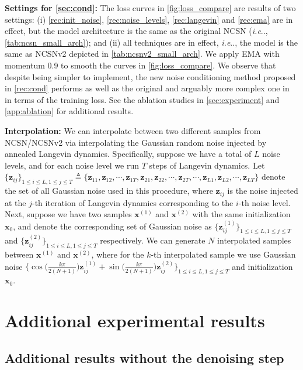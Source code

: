 \documentclass{article}
\makeatletter
\def\@onedot{\ifx\@let@token.\else.\null\fi\xspace}
\DeclareRobustCommand\onedot{\futurelet\@let@token\@onedot}
\newcommand{\bfx}{\mathbf{x}}
\newcommand{\bfz}{\mathbf{z}}
\def\ie{\emph{i.e}\onedot}
\makeatother
\begin{document}
\textbf{Settings for \cref{sec:cond}:}
The loss curves in \cref{fig:loss_compare} are results of two settings: (i) \cref{rec:init_noise}, \ref{rec:noise_levels}, \ref{rec:langevin} and \ref{rec:ema} are in effect, but the model architecture is the same as the original NCSN (\ie, \cref{tab:ncsn_small_arch}); and (ii) all techniques are in effect, \ie, the model is the same as NCSNv2 depicted in \cref{tab:ncsnv2_small_arch}. We apply EMA with momentum 0.9 to smooth the curves in \cref{fig:loss_compare}. We observe that despite being simpler to implement, the new noise conditioning method proposed in \cref{rec:cond} performs as well as the original and arguably more complex one in \cite{song2019generative} in terms of the training loss. See the ablation studies in \cref{sec:experiment} and \cref{app:ablation} for additional results.

\textbf{Interpolation:} We can interpolate between two different samples from NCSN/NCSNv2 via interpolating the Gaussian random noise injected by annealed Langevin dynamics. Specifically, suppose we have a total of $L$ noise levels, and for each noise level we run $T$ steps of Langevin dynamics. Let $\{\bfz_{ij}\}_{1\leq i\leq L, 1\leq j\leq T} \triangleq \{\bfz_{11}, \bfz_{12}, \cdots, \bfz_{1T}, \bfz_{21}, \bfz_{22}, \cdots, \bfz_{2T}, \cdots, \bfz_{L1}, \bfz_{L2}, \cdots, \bfz_{LT}\}$ denote the set of all Gaussian noise used in this procedure, where $\bfz_{ij}$ is the noise injected at the $j$-th iteration of Langevin dynamics corresponding to the $i$-th noise level. Next, suppose we have two samples $\bfx^{(1)}$ and $\bfx^{(2)}$ with the same initialization $\bfx_0$, and denote the corresponding set of Gaussian noise as $\{\bfz^{(1)}_{ij}\}_{1\leq i \leq L, 1\leq j \leq T}$ and $\{\bfz^{(2)}_{ij}\}_{1\leq i \leq L, 1\leq j \leq T}$ respectively. We can generate $N$ interpolated samples between $\bfx^{(1)}$ and $\bfx^{(2)}$, where for the $k$-th interpolated sample we use Gaussian noise $\{\cos \big(\frac{ k\pi}{2(N+1)}\big) \bfz_{ij}^{(1)} + \sin \big(\frac{k \pi}{2(N+1)}\big) \bfz_{ij}^{(2)}\}_{1\leq i\leq L, 1\leq j \leq T}$ and initialization $\bfx_0$.

\section{Additional experimental results}\label{app:exp_results}
\subsection{Additional results without the denoising step}\label{app:no_denoise_results}
\end{document}
